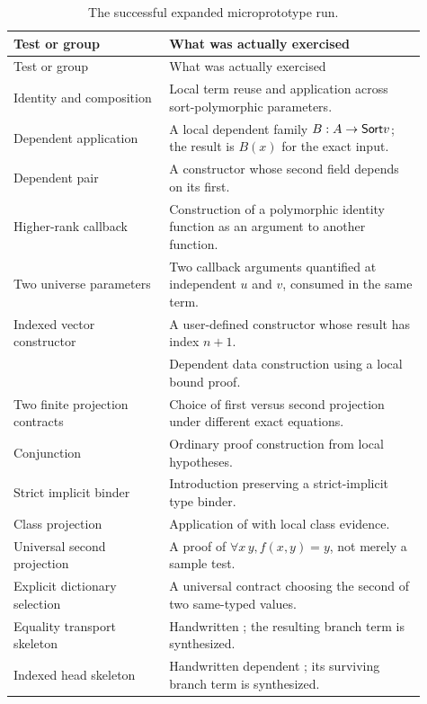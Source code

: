 \begin{longtable}{@{}L{0.34\linewidth}L{0.57\linewidth}@{}}
\caption{The successful expanded microprototype run.}\label{tab:microtests}\\
\toprule
Test or group & What was actually exercised \\
\midrule
\endfirsthead
\toprule Test or group & What was actually exercised \\\midrule
\endhead
\bottomrule\endfoot
Identity and composition & Local term reuse and application across sort-polymorphic parameters. \\
Dependent application & A local dependent family $B:A\to\mathsf{Sort} v$; the result is $B(x)$ for the exact input. \\
Dependent pair & A  constructor whose second field depends on its first. \\
Higher-rank callback & Construction of a polymorphic identity function as an argument to another function. \\
Two universe parameters & Two callback arguments quantified at independent $u$ and $v$, consumed in the same term. \\
Indexed vector constructor & A user-defined constructor whose result has index $n+1$. \\
 & Dependent data construction using a local bound proof. \\
Two finite projection contracts & Choice of first versus second projection under different exact equations. \\
Conjunction & Ordinary proof construction from local hypotheses. \\
Strict implicit binder & Introduction preserving a strict-implicit type binder. \\
Class projection & Application of  with local class evidence. \\
Universal second projection & A proof of $\forall x\,y, f(x,y)=y$, not merely a sample test. \\
Explicit dictionary selection & A universal contract choosing the second of two same-typed  values. \\
Equality transport skeleton & Handwritten ; the resulting branch term is synthesized. \\
Indexed head skeleton & Handwritten dependent ; its surviving branch term is synthesized. \\
\end{longtable}

